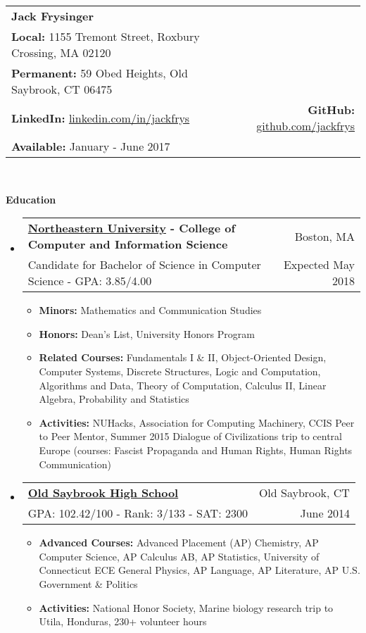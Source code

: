 \documentclass[letterpaper,10.6pt]{article}
\makeatletter
\newcommand{\resitem}[1]{\item #1 \vspace{-2pt}}
\newcommand{\resheading}[1]{{\large \colorbox{mygrey}{\begin{minipage}{\textwidth}{\textbf{#1 \vphantom{p\^{E}}}}\end{minipage}}}}
\newcommand{\ressubheading}[4]{
\begin{tabular*}{6.8in}{l@{\extracolsep{\fill}}r}
		\textbf{#1} & #2 \\
		\small{#3} & \small{#4} \\
\end{tabular*}\vspace{-6pt}}
\makeatother
\begin{document}
\newcommand{\mywebheader}{
\begin{tabular*}{7in}{l@{\extracolsep{\fill}}r}
	\textbf{\LARGE Jack Frysinger} &
	\\
	\textbf{Local:} 1155 Tremont Street, Roxbury Crossing, MA 02120 &
	\\\textbf{Permanent:} 59 Obed Heights, Old Saybrook, CT 06475 &
	\\
	\textbf{LinkedIn:} \href{http://linkedin.com/in/jackfrys}{linkedin.com/in/jackfrys} & \textbf{GitHub:} \href{https://github.com/jackfrys}{github.com/jackfrys}
	\\
	\textbf{Available:} January - June 2017
	\end{tabular*}
\\
\vspace{0.1in}}

\mywebheader

\resheading{Education}
	\begin{itemize}[leftmargin=*]
		\item[]
			\ressubheading{\href{http://www.northeastern.edu}{Northeastern University} - College of Computer and Information Science}{Boston, MA}{{Candidate for Bachelor of Science in Computer Science - }{GPA: 3.85/4.00}}{Expected May 2018}
				{ \footnotesize
				\begin{itemize}
					\resitem{\textbf{Minors:} Mathematics and Communication Studies}
					\resitem{\textbf{Honors:} Dean's List, University Honors Program}
					\resitem{\textbf{Related Courses:} Fundamentals I \& II, Object-Oriented Design, Computer Systems, Discrete Structures, Logic and Computation, Algorithms and Data, Theory of Computation, Calculus II, Linear Algebra, Probability and Statistics}
					\resitem{\textbf{Activities:} NUHacks, Association for Computing Machinery, CCIS Peer to Peer Mentor, Summer 2015 Dialogue of Civilizations trip to central Europe (courses: Fascist Propaganda and Human Rights, Human Rights Communication)}
				\end{itemize}}
		\item[]
			\ressubheading{\href{http://www.oldsaybrookschools.org/page.cfm?p=605}{Old Saybrook High School}}{Old Saybrook, CT}{{GPA: 102.42/100 - Rank: 3/133 - SAT: 2300}}{June 2014}
			{\footnotesize
			\begin{itemize}
				\resitem{\textbf{Advanced Courses:} Advanced Placement (AP) Chemistry, AP Computer Science, AP Calculus AB, AP Statistics, University of Connecticut ECE General Physics, AP Language, AP Literature, AP U.S. Government \& Politics}
				\resitem{\textbf{Activities:} National Honor Society, Marine biology research trip to Utila, Honduras, 230+ volunteer hours}
			\end{itemize}}
	\end{itemize} %
	
\end{document}
